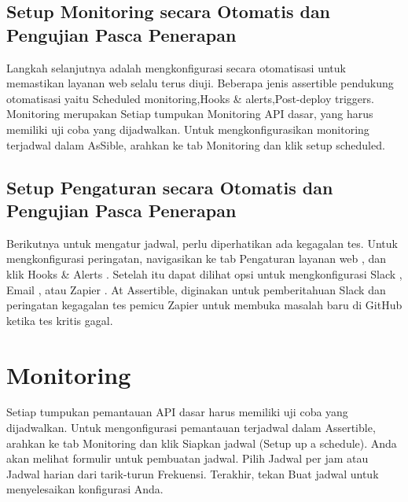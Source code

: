 \documentclass[12pt,a4paper]{article}
\begin{document}
\subsection{Setup Monitoring secara Otomatis dan Pengujian Pasca Penerapan}
Langkah selanjutnya adalah mengkonfigurasi secara otomatisasi untuk memastikan layanan web selalu terus diuji. 
Beberapa jenis assertible pendukung otomatisasi yaitu Scheduled monitoring,Hooks & alerts,Post-deploy triggers. Monitoring merupakan
Setiap tumpukan Monitoring API dasar, yang harus memiliki uji coba yang dijadwalkan. Untuk mengkonfigurasikan monitoring terjadwal dalam AsSible, arahkan ke tab Monitoring dan klik setup scheduled.

\subsection{Setup Pengaturan secara Otomatis dan Pengujian Pasca Penerapan}
Berikutnya untuk mengatur jadwal, perlu diperhatikan ada kegagalan tes. Untuk mengkonfigurasi peringatan, navigasikan ke tab Pengaturan layanan web , dan klik Hooks & Alerts . Setelah itu dapat dilihat opsi untuk mengkonfigurasi Slack , Email , atau Zapier . At Assertible, diginakan untuk pemberitahuan Slack dan peringatan kegagalan tes pemicu Zapier untuk membuka masalah baru di GitHub ketika tes kritis gagal. 

\section{Monitoring}
Setiap tumpukan pemantauan API dasar harus memiliki uji coba yang dijadwalkan. Untuk mengonfigurasi pemantauan terjadwal dalam Assertible, arahkan ke tab Monitoring dan klik Siapkan jadwal (Setup up a schedule).  Anda akan melihat formulir untuk pembuatan jadwal. Pilih Jadwal per jam atau Jadwal harian dari tarik-turun Frekuensi. Terakhir, tekan Buat jadwal untuk menyelesaikan konfigurasi Anda.
\end{document}
